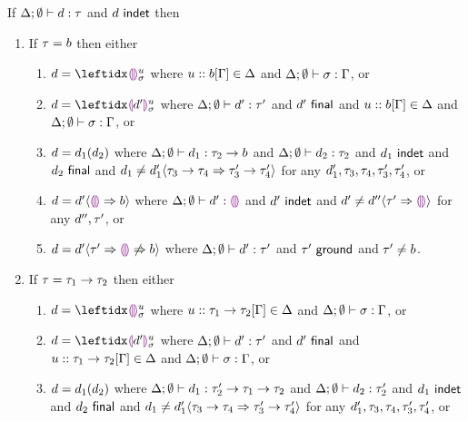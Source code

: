 \begin{lem}
  If $\Delta; \emptyset \vdash d : \tau$
  and $d~\mathsf{indet}$
  then
  \begin{enumerate}[nolistsep]
    \item 
      If $\tau = b$ then either
        \begin{enumerate}
          \item $\dexp = \dehole{u}{\subst}{}$ where $u :: b[\Gamma] \in \Delta$ and $\Delta; \emptyset \vdash \sigma : \Gamma$, or
          \item $\dexp = \dhole{\dexp'}{u}{\subst}{}$ where $\Delta; \emptyset \vdash d' : \tau'$ and $d'~\mathsf{final}$ and $u :: b[\Gamma] \in \Delta$ and $\Delta; \emptyset \vdash \sigma : \Gamma$, or
          \item $d = d_1(d_2)$ where $\Delta; \emptyset \vdash d_1 : \tau_2 \rightarrow b$ and $\Delta; \emptyset \vdash d_2 : \tau_2$ and $d_1~\mathsf{indet}$ and $d_2~\mathsf{final}$ and $d_1 \neq d_1' \langle{\tau_3 \rightarrow \tau_4}\Rightarrow{\tau_3' \rightarrow \tau_4'}\rangle$ for any $d_1', \tau_3, \tau_4, \tau_3', \tau_4'$, or 
          \item $d = d' \langle{\textcolor{violet}{\llparenthesis}\textcolor{violet}{\rrparenthesis}}\Rightarrow{b}\rangle$ where $\Delta; \emptyset \vdash d' : \textcolor{violet}{\llparenthesis}\textcolor{violet}{\rrparenthesis}$ and $d'~\mathsf{indet}$ and $d' \neq d'' \langle{\tau'}\Rightarrow{\textcolor{violet}{\llparenthesis}\textcolor{violet}{\rrparenthesis}}\rangle$ for any $d'', \tau'$, or 
          \item $d = d' \langle{\tau'}\Rightarrow{\textcolor{violet}{\llparenthesis}\textcolor{violet}{\rrparenthesis}}\not\Rightarrow{b}\rangle$ where $\Delta; \emptyset \vdash d' : \tau'$ and $\tau'~\mathsf{ground}$ and $\tau' \neq b$.
        \end{enumerate}
    \item 
      If $\tau = \tau_1 \rightarrow \tau_2$ then either 
        \begin{enumerate}
          \item $\dexp = \dehole{u}{\subst}{}$ where $u :: \tau_1 \rightarrow \tau_2[\Gamma] \in \Delta$ and $\Delta; \emptyset \vdash \sigma : \Gamma$, or
          \item $\dexp = \dhole{\dexp'}{u}{\subst}{}$ where $\Delta; \emptyset \vdash d' : \tau'$ and $d'~\mathsf{final}$ and $u :: \tau_1 \rightarrow \tau_2[\Gamma] \in \Delta$ and $\Delta; \emptyset \vdash \sigma : \Gamma$, or
          \item $d = d_1(d_2)$ where $\Delta; \emptyset \vdash d_1 : \tau_2' \rightarrow \tau_1 \rightarrow \tau_2$ and $\Delta; \emptyset \vdash d_2 : \tau_2'$ and $d_1~\mathsf{indet}$ and $d_2~\mathsf{final}$ and $d_1 \neq d_1' \langle{\tau_3 \rightarrow \tau_4}\Rightarrow{\tau_3' \rightarrow \tau_4'}\rangle$ for any $d_1', \tau_3, \tau_4, \tau_3', \tau_4'$, or 

\end{enumerate}
\end{enumerate}
\end{lem}
